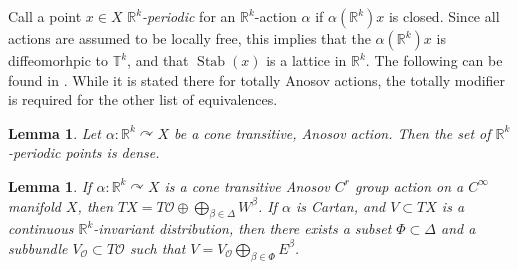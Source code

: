 \documentclass[12pt]{amsart}
\newtheorem{lemma}[theorem]{Lemma}
\theoremstyle{definition}
\theoremstyle{remark}
\numberwithin{equation}{section}
\newcommand{\R}{\mathbb{R}}
\newcommand{\mc}{\mathcal}
\newtheorem{Structural Stability Theorem}[theorem]{Structural Stability Theorem}
\def\Stab{\operatorname{Stab}}
\begin{document}

Call a point $x \in X$ {\it $\R^k$-periodic} for an $\R^k$-action $\alpha$ if $\alpha(\R^k)x$ is closed. Since all actions are assumed to be locally free, this implies that the $\alpha(\R^k)x$ is diffeomorhpic to $\mathbb{T}^k$, and that $\Stab(x)$ is a lattice in $\R^k$. The following can be found in \cite[Lemma 4.17]{spatzier-vinhage}. While it is stated there for totally Anosov actions, the totally modifier is required for the other list of equivalences.

\begin{lemma}
\label{lem:dense-periodic}
Let $\alpha : \R^k \curvearrowright X$ be a cone transitive, Anosov action. Then the set of $\R^k$-periodic points is dense.
\end{lemma}

\begin{lemma}
\label{lem:invariant-bundles}
If $\alpha : \R^k \curvearrowright X$ is a { cone transitive} Anosov $C^r$ group action on a $C^\infty$ manifold $X$, then $TX = T\mc O \oplus \bigoplus_{\beta \in \Delta} W^\beta$. If $\alpha$ is Cartan, and $V \subset TX$ is a {  continuous} $\R^k$-invariant distribution, then there exists a subset $\Phi \subset \Delta$ and a subbundle $V_{\mc O} \subset T \mc O$ such that $V = V_{\mc O} \bigoplus_{\beta \in \Phi} E^\beta$.
\end{lemma}
\end{document}
